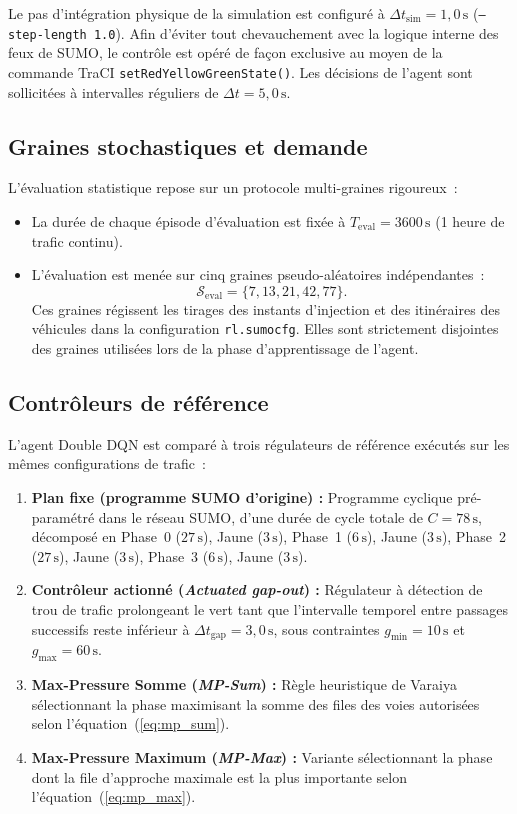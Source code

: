\documentclass[10pt,twocolumn,letterpaper]{article}
\begin{document}
Le pas d'intégration physique de la simulation est configuré à $\Delta t_{\text{sim}} = 1{,}0\,\mathrm{s}$ (\texttt{--step-length 1.0}). Afin d'éviter tout chevauchement avec la logique interne des feux de SUMO, le contrôle est opéré de façon exclusive au moyen de la commande TraCI \texttt{setRedYellowGreenState()}. Les décisions de l'agent sont sollicitées à intervalles réguliers de $\Delta t = 5{,}0\,\mathrm{s}$.

\subsection{Graines stochastiques et demande}
L'évaluation statistique repose sur un protocole multi-graines rigoureux~:
\begin{itemize}[nosep]
    \item La durée de chaque épisode d'évaluation est fixée à $T_{\text{eval}} = 3600\,\mathrm{s}$ (1 heure de trafic continu).
    \item L'évaluation est menée sur cinq graines pseudo-aléatoires indépendantes~:
    \begin{equation}
    \mathcal{S}_{\text{eval}} = \{7, 13, 21, 42, 77\}.
    \end{equation}
    Ces graines régissent les tirages des instants d'injection et des itinéraires des véhicules dans la configuration \texttt{rl.sumocfg}. Elles sont strictement disjointes des graines utilisées lors de la phase d'apprentissage de l'agent.
\end{itemize}

\subsection{Contrôleurs de référence}
L'agent Double DQN est comparé à trois régulateurs de référence exécutés sur les mêmes configurations de trafic~:
\begin{enumerate}[nosep]
    \item \textbf{Plan fixe (programme SUMO d'origine) : } Programme cyclique pré-paramétré dans le réseau SUMO, d'une durée de cycle totale de $C = 78\,\mathrm{s}$, décomposé en Phase~0 ($27\,\mathrm{s}$), Jaune ($3\,\mathrm{s}$), Phase~1 ($6\,\mathrm{s}$), Jaune ($3\,\mathrm{s}$), Phase~2 ($27\,\mathrm{s}$), Jaune ($3\,\mathrm{s}$), Phase~3 ($6\,\mathrm{s}$), Jaune ($3\,\mathrm{s}$).
    \item \textbf{Contrôleur actionné (\emph{Actuated gap-out}) : } Régulateur à détection de trou de trafic prolongeant le vert tant que l'intervalle temporel entre passages successifs reste inférieur à $\Delta t_{\text{gap}} = 3{,}0\,\mathrm{s}$, sous contraintes $g_{\min} = 10\,\mathrm{s}$ et $g_{\max} = 60\,\mathrm{s}$.
    \item \textbf{Max-Pressure Somme (\emph{MP-Sum}) : } Règle heuristique de Varaiya sélectionnant la phase maximisant la somme des files des voies autorisées selon l'équation~(\ref{eq:mp_sum}).
    \item \textbf{Max-Pressure Maximum (\emph{MP-Max}) : } Variante sélectionnant la phase dont la file d'approche maximale est la plus importante selon l'équation~(\ref{eq:mp_max}).
\end{enumerate}
\end{document}
